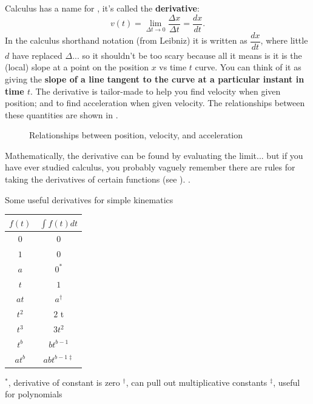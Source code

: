 \documentclass{tufte-handout}
\begin{document}
Calculus has a name for , it's called the \textbf{derivative}:
\begin{equation}
v(t) = \lim_{\Delta t\to 0} \dfrac{\Delta x}{\Delta t} = \dfrac{dx}{dt}.
\label{eq:derivatives3}
\end{equation}
In the calculus shorthand notation (from Leibniz) it is written as $\dfrac{dx}{dt}$, where little $d$ have replaced $\Delta$... so it shouldn't be too scary because all it means is it is the (local) slope at a point on the position $x$ vs time $t$ curve. You can think of it as giving the \textbf{slope of a line tangent to the curve at a particular instant in time $t$}. The derivative is tailor-made to help you find velocity when given position; and to find acceleration when given velocity. The relationships between these quantities are shown in .
\begin{figure}
\caption{Relationships between position, velocity, and acceleration}
\label{fig:derivatives1}
\end{figure}
Mathematically, the derivative can be found by evaluating the limit... but if you have ever studied calculus, you probably vaguely remember there are rules for taking the derivatives of certain functions (see ). . 
\begin{margintable}
\caption{Some useful derivatives for simple kinematics}
\label{tab:derivatives}
\begin{center}
\small
\begin{tabular}{cc}
\toprule
$f(t)$ & $\int f(t) dt$ \\
\midrule
$0$ & $0$ \\
$1$ & $0$ \\
$a$ & $0^*$\\
$t$ & $1$ \\
$at$ & $a^\dag$\\
$t^2$ & $2$ t \\
$t^3$ & $3 t^2$ \\
$t^b$ & $b t^{b-1}$ \\
$at^b$ & $a b t^{b-1 \ddag}$\\
\bottomrule
\end{tabular}
\end{center}
\scriptsize
$^*$, derivative of constant is zero
$^\dag$, can pull out multiplicative constants
$^\ddag$, useful for polynomials  
\end{margintable}
\end{document}
